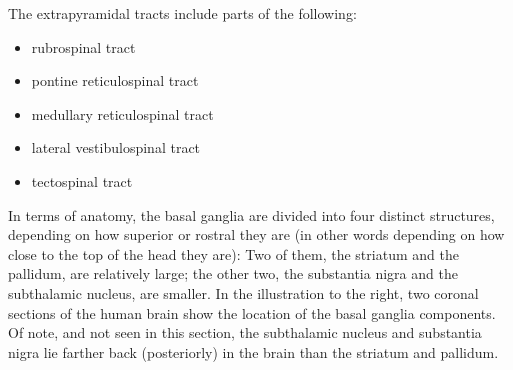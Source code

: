 The extrapyramidal tracts include parts of the following:

\begin{itemize}
\tightlist
\item
  rubrospinal tract
\item
  pontine reticulospinal tract
\item
  medullary reticulospinal tract
\item
  lateral vestibulospinal tract
\item
  tectospinal tract
\end{itemize}

In terms of anatomy, the basal ganglia are divided into four distinct
structures, depending on how superior or rostral they are (in other
words depending on how close to the top of the head they are): Two of
them, the striatum and the pallidum, are relatively large; the other
two, the substantia nigra and the subthalamic nucleus, are smaller. In
the illustration to the right, two coronal sections of the human brain
show the location of the basal ganglia components. Of note, and not seen
in this section, the subthalamic nucleus and substantia nigra lie
farther back (posteriorly) in the brain than the striatum and pallidum.

\href{the-gustatory-system.html}{\emph{}}
\href{major-diseases-of-the-nervous-system.html}{\emph{}}
